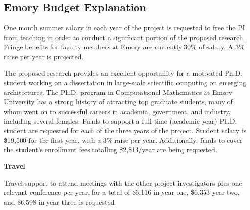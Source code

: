 \subsection*{Emory Budget Explanation}


One month summer salary in each year of the project is requested to free the
PI from teaching in order to conduct a significant portion of the proposed
research. Fringe benefits for faculty members at Emory are currently 30\% of
salary. A 3\% raise per year is projected.

The proposed research provides an excellent opportunity for a motivated Ph.D.
student working on a dissertation in large-scale scientific computing on
emerging architectures.  The Ph.D. program in Computational Mathematics at
Emory University has a strong history of attracting top graduate students,
many of whom went on to successful careers in academia, government, and
industry, including several females.  Funds to support a full-time (academic
year) Ph.D.  student are requested for each of the three years of the project.
Student salary is \$19,500 for the first year, with a 3\% raise per year.
Additionally, funds to cover the student's enrollment fees totalling
\$2,813/year are being requested.

\medskip
\par\noindent 
{\bf Travel}

Travel support to attend meetings with the other project investigators plus
one relevant conference per year, for a total of \$6,116 in year one, \$6,353
year two, and \$6,598 in year three is requested.


\pagebreak
\endinput


